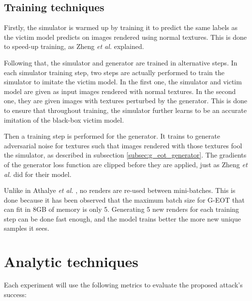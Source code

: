 \subsection{Training techniques}
    \label{subsec:training}

Firstly, the simulator is warmed up by training it to predict the same labels as the victim model predicts on images rendered using normal textures. This is done to speed-up training, as Zheng \textit{et al.} \cite{zheng_black_box_GAN} explained.

Following that, the simulator and generator are trained in alternative steps. In each simulator training step, two steps are actually performed to train the simulator to imitate the victim model. In the first one, the simulator and victim model are given as input images rendered with normal textures. In the second one, they are given images with textures perturbed by the generator. This is done to ensure that throughout training, the simulator further learns to be an accurate imitation of the black-box victim model.

Then a training step is performed for the generator. It trains to generate adversarial noise for textures such that images rendered with those textures fool the simulator, as described in subsection \ref{subsec:g_eot_generator}. The gradients of the generator loss function are clipped before they are applied, just as Zheng \textit{et al.} \cite{zheng_black_box_GAN} did for their model.

Unlike in Athalye \textit{et al.} \cite{athalye}, no renders are re-used between mini-batches. This is done because it has been observed that the maximum batch size for G-EOT that can fit in 8GB of memory is only 5. Generating 5 new renders for each training step can be done fast enough, and the model trains better the more new unique samples it sees.

\section{Analytic techniques}
    \label{sec:analytic_techniques}
    
Each experiment will use the following metrics to evaluate the proposed attack's success:

